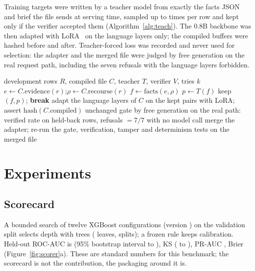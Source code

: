 \documentclass[twocolumn,10pt]{article}
\begin{document}
Training targets were written by a teacher model from exactly the facts JSON and brief the file sends at serving time,
sampled up to \nTries{} times per row and kept only if the verifier accepted them (Algorithm~\ref{alg:teach}). The 0.8B
backbone was then adapted with LoRA~\cite{hu2022lora} on the language layers only; the compiled buffers were hashed before
and after. Teacher-forced loss was recorded and never used for selection: the adapter and the merged file were judged by
free generation on the real request path, including the seven refusals with the language layers forbidden.

\begin{algorithm}[t]
\caption{Verifier-filtered targets and gated adaptation}
\label{alg:teach}
\begin{algorithmic}[1]
\Require development rows $R$, compiled file $C$, teacher $T$, verifier $V$, tries $k$
  \State $e \gets C.\mathrm{evidence}(r)$;\quad $\rho \gets C.\mathrm{recourse}(r)$
  \State $f \gets \mathrm{facts}(e, \rho)$ 
    \State $p \gets T(f)$
     keep $(f, p)$; \textbf{break} \EndIf
  \EndFor
\EndFor
\State adapt the language layers of $C$ on the kept pairs with LoRA; assert $\mathrm{hash}(C.\mathrm{compiled}) $ unchanged
\State gate by free generation on the real path: verified rate on held-back rows, refusals $= 7/7$ with no model call
\State merge the adapter; re-run the gate, verification, tamper and determinism tests on the merged file
\end{algorithmic}
\end{algorithm}

\section{Experiments}
\label{sec:experiments}

\subsection{Scorecard}

A bounded search of twelve XGBoost configurations (version \nXGBVersion{}) on the validation split selects depth
\nMaxDepth{} with \nTrees{} trees (\nLeaves{} leaves, \nSplits{} splits); a frozen rule keeps \nCalibration{}
calibration. Held-out ROC-AUC is \nTestAUC{} (95\% bootstrap interval \nTestAUCLo{} to \nTestAUCHi{}), KS \nTestKS{}
(\nTestKSLo{} to \nTestKSHi{}), PR-AUC \nTestPRAUC{}, Brier \nTestBrier{} (Figure~\ref{fig:scorer}a). These are
standard numbers for this benchmark; the scorecard is not the contribution, the packaging around it is.
\end{document}
